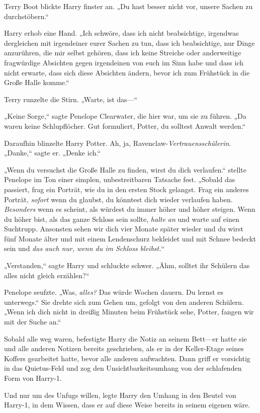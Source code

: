 {Terry Boot blickte Harry finster an. „Du hast besser nicht vor, unsere Sachen zu durchstöbern.“

Harry erhob eine Hand. „Ich schwöre, dass ich nicht beabsichtige, irgendwas dergleichen mit irgendeiner eurer Sachen zu tun, dass ich beabsichtige, nur Dinge anzurühren, die mir selbst gehören, dass ich keine Streiche oder anderweitige fragwürdige Absichten gegen irgendeinen von euch im Sinn habe und dass ich nicht erwarte, dass sich diese Absichten ändern, bevor ich zum Frühstück in die Große Halle komme.“

Terry runzelte die Stirn. „Warte, ist das—“

„Keine Sorge,“ sagte Penelope Clearwater, die hier war, um sie zu führen. „Da waren keine Schlupflöcher. Gut formuliert, Potter, du solltest Anwalt werden.“

Daraufhin blinzelte Harry Potter. Ah, ja, Ravenclaw-\emph{Vertrauensschülerin}. „Danke,“ sagte er. „Denke ich.“

„Wenn du versuchst die Große Halle zu finden, wirst du dich verlaufen.“ stellte Penelope im Ton einer simplen, unbestreitbaren Tatsache fest. „Sobald das passiert, frag ein Porträt, wie du in den ersten Stock gelangst. Frag ein anderes Porträt, \emph{sofort} wenn du glaubst, du könntest dich wieder verlaufen haben. \emph{Besonders} wenn es scheint, als würdest du immer höher und höher steigen. Wenn du höher bist, als das ganze Schloss sein sollte, \emph{halte an} und warte auf einen Suchtrupp. Ansonsten sehen wir dich vier Monate später wieder und du wirst fünf Monate älter und mit einem Lendenschurz bekleidet und mit Schnee bedeckt sein und \emph{das auch nur, wenn du im Schloss bleibst.}“

„Verstanden,“ sagte Harry und schluckte schwer. „Ähm, solltet ihr Schülern das alles nicht gleich erzählen?“

Penelope seufzte. „Was, \emph{alles?} Das würde Wochen dauern. Du lernst es unterwegs.“ Sie drehte sich zum Gehen um, gefolgt von den anderen Schülern. „Wenn ich dich nicht in dreißig Minuten beim Frühstück sehe, Potter, fangen wir mit der Suche an.“

Sobald alle weg waren, befestigte Harry die Notiz an seinem Bett—er hatte sie und alle anderen Notizen bereits geschrieben, als er in der Keller-Etage seines Koffers gearbeitet hatte, bevor alle anderen aufwachten. Dann griff er vorsichtig in das Quietus-Feld und zog den Unsichtbarkeitsumhang von der schlafenden Form von Harry-1.

Und nur um des Unfugs willen, legte Harry den Umhang in den Beutel von Harry-1, in dem Wissen, dass er auf diese Weise bereits in seinem eigenen wäre.

}
